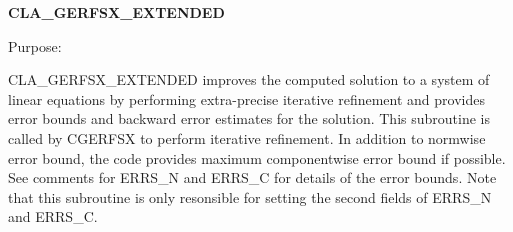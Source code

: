 {\bfseries C\+L\+A\+\_\+\+G\+E\+R\+F\+S\+X\+\_\+\+E\+X\+T\+E\+N\+D\+E\+D} 

 \begin{DoxyParagraph}{Purpose\+: }
\begin{DoxyVerb} CLA_GERFSX_EXTENDED improves the computed solution to a system of
 linear equations by performing extra-precise iterative refinement
 and provides error bounds and backward error estimates for the solution.
 This subroutine is called by CGERFSX to perform iterative refinement.
 In addition to normwise error bound, the code provides maximum
 componentwise error bound if possible. See comments for ERRS_N
 and ERRS_C for details of the error bounds. Note that this
 subroutine is only resonsible for setting the second fields of
 ERRS_N and ERRS_C.\end{DoxyVerb}
 
\end{DoxyParagraph}

